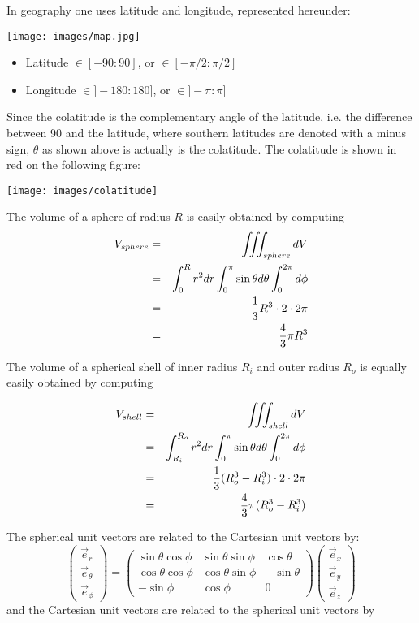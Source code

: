 In geography one uses latitude and longitude, represented hereunder:
\begin{center}
\texttt{[image: images/map.jpg]}
\end{center}
\begin{itemize}
\item Latitude  $\in[-90:90]$,   or $\in[-\pi/2:\pi/2]$ 
\item Longitude $\in]-180:180]$, or $\in]-\pi:\pi]$ 
\end{itemize}

Since the colatitude is the complementary angle of the latitude, 
i.e. the difference between 90 and the latitude, 
where southern latitudes are denoted with a minus sign,
$\theta$ as shown above is actually is the colatitude.
The colatitude is shown in red on the following figure: 
\begin{center}
\texttt{[image: images/colatitude]}
\end{center}

The volume of a sphere of radius $R$ is easily obtained by computing 
\begin{eqnarray}
V_{sphere} 
&=& \iiint_{sphere} dV \nonumber\\
&=& \int_0^R r^2 dr \int_0^\pi \sin\theta d\theta \int_0^{2\pi} d\phi  \nonumber\\
&=& \frac{1}{3}R^3  \cdot 2 \cdot 2\pi \nonumber\\
&=& \frac{4}{3}\pi R^3 
\end{eqnarray}

The volume of a spherical shell of inner radius $R_i$ and outer radius $R_o$
is equally easily obtained by computing 

\begin{eqnarray}
V_{shell}
&=& \iiint_{shell} dV \nonumber\\
&=& \int_{R_i}^{R_o} r^2 dr \int_0^\pi \sin\theta d\theta \int_0^{2\pi} d\phi  \nonumber\\
&=& \frac{1}{3}(R_o^3-R_i^3)  \cdot 2 \cdot 2\pi \nonumber\\
&=& \frac{4}{3}\pi (R^3_o -R^3_i)
\end{eqnarray}


\noindent The spherical unit vectors are related to the Cartesian unit vectors by:
\[
\left(
\begin{array}{c}
\vec{e}_{r} \\ \vec{e}_\theta \\ \vec{e}_\phi
\end{array}
\right)
=
\left(
\begin{array}{ccc}
\sin\theta \cos\phi & \sin\theta\sin\phi & \cos\theta  \\
\cos\theta \cos\phi & \cos\theta\sin\phi & -\sin\theta \\
-\sin\phi & \cos\phi & 0
\end{array}
\right)
\left(
\begin{array}{c}
\vec{e}_{x} \\ \vec{e}_y \\ \vec{e}_z
\end{array}
\right)
\]
and the Cartesian unit vectors are related to the spherical unit vectors by

